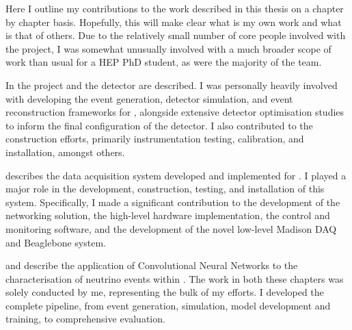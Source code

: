 \begin{preface}
    Here I outline my contributions to the work described in this thesis on a chapter by chapter
    basis. Hopefully, this will make clear what is my own work and what is that of others. Due to
    the relatively small number of core people involved with the \chips project, I was somewhat
    unusually involved with a much broader scope of work than usual for a HEP PhD student, as were
    the majority of the \chips team.

    In  the \chips project and the \chipsfive detector are described. I was
    personally heavily involved with developing the event generation, detector simulation, and
    event reconstruction frameworks for \chips, alongside extensive detector optimisation studies
    to inform the final configuration of the \chipsfive detector. I also contributed to the
    \chipsfive construction efforts, primarily instrumentation testing, calibration, and
    installation, amongst others.

     describes the data acquisition system developed and implemented for
    \chipsfive. I played a major role in the development, construction, testing, and installation
    of this system. Specifically, I made a significant contribution to the development of the
    networking solution, the high-level hardware implementation, the control and monitoring
    software, and the development of the novel low-level Madison \si{\micro}DAQ and Beaglebone
    system.

     and  describe the application of Convolutional
    Neural Networks to the characterisation of neutrino events within \chipsfive. The work in both
    these chapters was solely conducted by me, representing the bulk of my efforts. I developed
    the complete pipeline, from event generation, simulation, model development and training, to
    comprehensive evaluation.
\end{preface}

\tableofcontents %